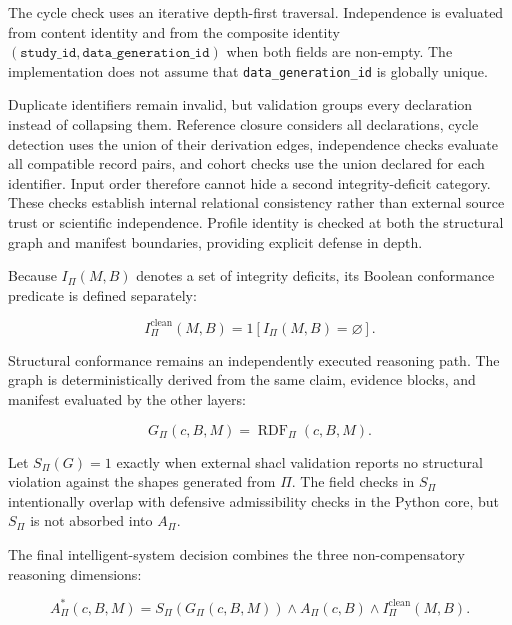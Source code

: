 \documentclass[11pt,a4paper]{article}
\begin{document}



The cycle check uses an iterative depth-first traversal. Independence is
evaluated from content identity and from the composite identity
$(\texttt{study\_id},\texttt{data\_generation\_id})$ when both fields are
non-empty. The implementation does not assume that
\texttt{data\_generation\_id} is globally unique.

Duplicate identifiers remain invalid, but validation groups every declaration
instead of collapsing them. Reference closure considers all declarations,
cycle detection uses the union of their derivation edges, independence checks
evaluate all compatible record pairs, and cohort checks use the union
declared for each identifier. Input order therefore cannot hide a second
integrity-deficit category. These checks establish internal relational
consistency rather than external source trust or scientific independence.
Profile identity is checked at both the structural graph and manifest
boundaries, providing explicit defense in depth.

Because $I_{\Pi}(M,B)$ denotes a set of integrity deficits, its Boolean
conformance predicate is defined separately:

\begin{equation}
I^{\mathrm{clean}}_{\Pi}(M,B)=
\mathrm{1}[I_{\Pi}(M,B)=\varnothing].
\label{eq:integrity-clean}
\end{equation}

Structural conformance remains an independently executed reasoning path. The
graph is deterministically derived from the same claim, evidence blocks, and
manifest evaluated by the other layers:

\begin{equation}
G_{\Pi}(c,B,M)=\operatorname{RDF}_{\Pi}(c,B,M).
\label{eq:package-rdf}
\end{equation}

Let $S_{\Pi}(G)=1$ exactly when external \ac{shacl} validation reports no
structural violation against the shapes generated from $\Pi$. The field checks
in $S_{\Pi}$ intentionally overlap with defensive admissibility checks in the
Python core, but $S_{\Pi}$ is not absorbed into $A_{\Pi}$.

The final intelligent-system decision combines the three non-compensatory
reasoning dimensions:

\begin{equation}
A^{*}_{\Pi}(c,B,M)=
S_{\Pi}(G_{\Pi}(c,B,M))
\land A_{\Pi}(c,B)
\land I^{\mathrm{clean}}_{\Pi}(M,B).
\label{eq:integrity-authorization}
\end{equation}
\end{document}
